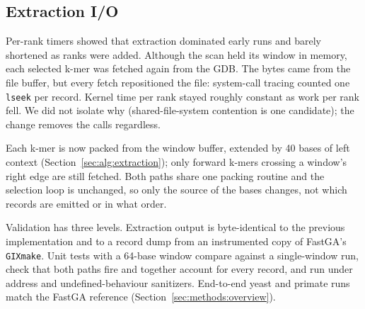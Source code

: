 \subsection{Extraction I/O}\label{sec:impl:o1}

Per-rank timers showed that extraction dominated early runs and barely
shortened as ranks were added. Although the scan held its window in memory,
each selected k-mer was fetched again from the GDB. The bytes came from the
file buffer, but every fetch repositioned the file: system-call tracing
counted one \texttt{lseek} per record. Kernel time per rank stayed roughly
constant as work per rank fell. We did not isolate why (shared-file-system
contention is one candidate); the change removes the calls regardless.

Each k-mer is now packed from the window buffer, extended by 40 bases of
left context (Section~\ref{sec:alg:extraction}); only forward k-mers
crossing a window's right edge are still fetched. Both paths share one
packing routine and the selection loop is unchanged, so only the source of
the bases changes, not which records are emitted or in what order.

Validation has three levels. Extraction output is byte-identical to the
previous implementation and to a record dump from an instrumented copy of
FastGA's \texttt{GIXmake}. Unit tests with a 64-base window compare against
a single-window run, check that both paths fire and together account for
every record, and run under address and undefined-behaviour sanitizers.
End-to-end yeast and primate runs match the FastGA reference
(Section~\ref{sec:methods:overview}).
